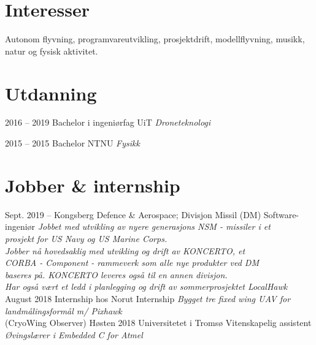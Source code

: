 \documentclass[]{friggeri-cv}
\begin{document}
\section{Interesser}

Autonom flyvning, programvareutvikling, prosjektdrift, modellflyvning, musikk,\\ natur og fysisk aktivitet.

\section{Utdanning}

\begin{entrylist}
  \entry
    {2016 -- 2019}
    {Bachelor i ingeniørfag}
    {UiT}
    {\emph{Droneteknologi}}
    
  \entry
    {2015 -- 2015}
    {Bachelor}
    {NTNU}
    {\emph{Fysikk}}
\end{entrylist}


\section{Jobber \& internship}
\begin{entrylist}
	\entry
	{Sept. 2019 -- }
	{Kongsberg Defence \& Aerospace; Divisjon Missil (DM)}
	{Software-ingeniør}
	{\emph{Jobbet med utvikling av nyere generasjons NSM - missiler i et \\ prosjekt for US Navy og US Marine Corps. \\
	Jobber nå hovedsaklig med utvikling og drift av KONCERTO, et \\CORBA - Component - rammeverk som alle nye produkter ved DM\\ baseres på. KONCERTO leveres også til en annen divisjon.\\
	Har også vært et ledd i planlegging og drift av sommerprosjektet LocalHawk}}
    \entry
    {August 2018}
    {Internship hos Norut}
    {Internship}
    {\emph{Bygget tre fixed wing UAV for landmålingsformål m/ Pixhawk}\\(CryoWing Observer)}
	\entry
   {Høsten 2018}
   {Universitetet i Tromsø}
   {Vitenskapelig assistent}
   {\emph{Øvingslærer i Embedded C for Atmel}}    
    
\end{entrylist}

%
\end{document}
